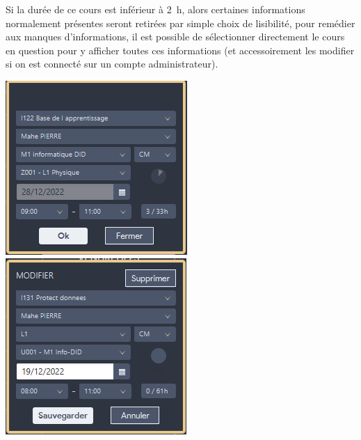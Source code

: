 \documentclass[a4paper,french,final]{memoir}
\begin{document}
\begin{minipage}{0.45\textwidth}
Si la durée de ce cours est inférieur à 2 h, alors certaines informations normalement présentes seront retirées par simple choix de lisibilité, pour remédier aux manques d'informations, il est possible de sélectionner directement le cours en question pour y afficher toutes ces informations (et accessoirement les modifier si on est connecté sur un compte administrateur).


\end{minipage}
\hspace{1.5cm}
\begin{minipage}{0.45\textwidth}
\includegraphics[width=\textwidth]{figures/studentSlotInfoPanel.png}
\vspace{0.5cm}
\includegraphics[width=\textwidth]{figures/adminSlotInfoPanel.png}
\vspace{1.5cm}
\end{minipage}
\end{document}

